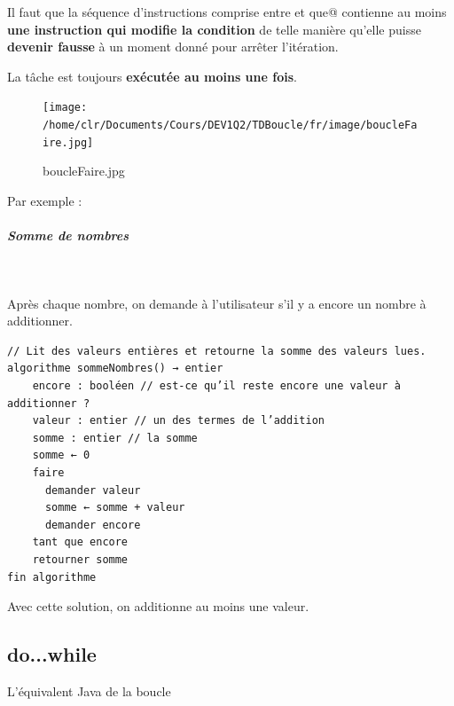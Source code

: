 \documentclass[11pt,a4paper]{article}
\begin{document}
            \par
        
        Il faut que la s\'equence d'instructions comprise entre \verb@faire@ 
        et \verb@tant que@ contienne au moins 
        \textbf{une instruction qui modifie la condition} de telle mani\`ere 
        qu'elle puisse \textbf{devenir fausse} \`a un moment donn\'e pour arr\^eter l'it\'eration.
      
            \par
        
        La t\^ache est toujours \textbf{ex\'ecut\'ee au moins une fois}.
      
            \par
        \begin{figure}[hbt]
				    \begin{center}
					\texttt{[image: /home/clr/Documents/Cours/DEV1Q2/TDBoucle/fr/image/boucleFaire.jpg]}
						\end{center}
                
                    \caption[boucleFaire.jpg]{boucleFaire.jpg}
                \end{figure}
                    
            \par
        Par exemple : 
            \par
        
			
		\subparagraph{Somme de nombres} 
		
					\textcolor{white}{.} \par
				 Apr\`es chaque nombre, on demande \`a l'utilisateur s'il y a encore un nombre \`a additionner.
            \par
        \begin{verbatim}
// Lit des valeurs entières et retourne la somme des valeurs lues.
algorithme sommeNombres() → entier
    encore : booléen // est-ce qu’il reste encore une valeur à additionner ?
    valeur : entier // un des termes de l’addition
    somme : entier // la somme
    somme ← 0
    faire
      demander valeur
      somme ← somme + valeur
      demander encore
    tant que encore
    retourner somme
fin algorithme
      \end{verbatim}Avec cette solution, on additionne au moins une valeur.
            \par
        \subsection{do...while}
		    L'\'equivalent Java de la boucle 
		  
\end{document}
